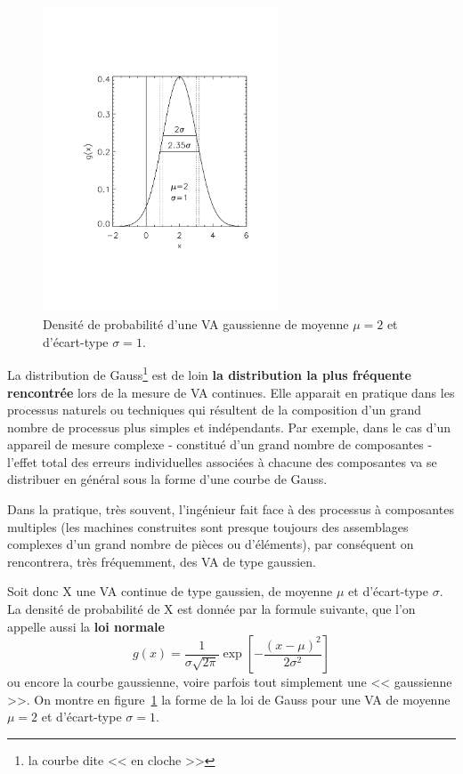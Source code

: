 \begin{figure}[h!]
   \centering
   \includegraphics[width=7cm]{assets/figures/loiGaussienne.pdf}
   \caption{Densité de probabilité d'une VA gaussienne de moyenne $\mu=2$ et d'écart-type $\sigma=1$.}
   \label{fig:ddpdlldg}
\end{figure}
La distribution de Gauss\footnote{la courbe dite << en cloche >>} est de loin \textbf{la distribution la plus fréquente rencontrée} lors de la mesure de VA continues. Elle apparait en pratique dans les processus naturels ou techniques qui résultent de la composition d'un grand nombre de processus plus simples et indépendants. Par exemple, dans le cas d'un appareil de mesure complexe - constitué d'un grand nombre de composantes - l'effet total des erreurs individuelles associées à chacune des composantes va se distribuer en général sous la forme d'une courbe de Gauss.

Dans la pratique, très souvent, l'ingénieur fait face à des processus à composantes multiples (les machines construites sont presque toujours des assemblages complexes d'un grand nombre de pièces ou d'éléments), par conséquent on rencontrera, très fréquemment, des VA de type gaussien.

Soit donc X une VA continue de type gaussien, de moyenne $\mu$ et d'écart-type $\sigma$. La densité de probabilité de X est donnée par la formule suivante, que l'on appelle aussi la \textbf{loi normale}
\begin{equation}
g(x)=\frac{1}{\sigma\sqrt{2\pi}}\exp{\left[-\frac{(x-\mu)^2}{2\sigma^2}\right]}
\end{equation}
ou encore la courbe gaussienne, voire parfois tout simplement une << gaussienne >>. On montre en figure~\ref{fig:ddpdlldg} la forme de la loi de Gauss pour une VA de moyenne $\mu=2$ et d'écart-type $\sigma=1$.

